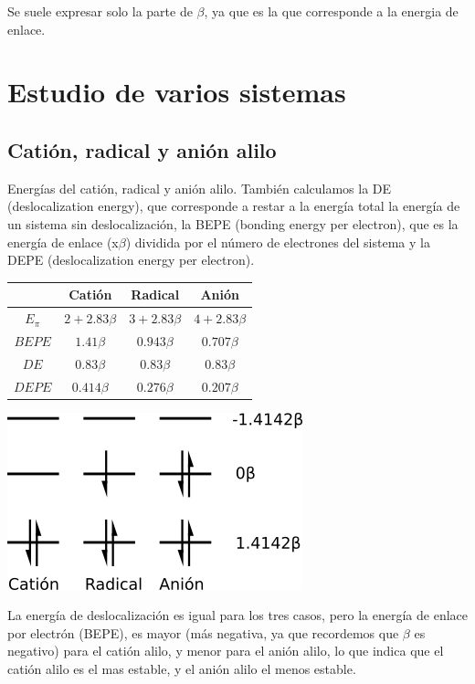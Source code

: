 \documentclass[12pt]{article}
\begin{document}
Se suele expresar solo la parte de $\beta$, ya que es la que corresponde a la energia de enlace.  \cite{yates}






\section{Estudio de varios sistemas}

\subsection{Catión, radical y anión alilo}

Energías del catión, radical y anión alilo.
También calculamos la DE (deslocalization energy), que corresponde a restar a la energía total la energía de un sistema sin deslocalización, la BEPE (bonding energy per electron), que es la energía de enlace (x$\beta$) dividida por el número de electrones del sistema y la DEPE (deslocalization energy per electron). \cite{yates}
\begin{center}
\begin{tabular}{|c|c|c|c|}
\hline
    & Catión & Radical & Anión \\
\hline
    $E_{\pi}$ & $2+2.83 \beta$  & $3+2.83 \beta$  & $4+2.83 \beta$ \\
    $BEPE$    & $1.41 \beta$    & $0.943 \beta$   & $0.707 \beta$  \\ 
    $DE$      & $0.83 \beta$    & $0.83 \beta$    & $0.83 \beta$   \\
    $DEPE$    & $0.414 \beta$   & $0.276 \beta$   & $0.207 \beta$  \\ 
\hline
\end{tabular}
\end{center}

\begin{center}
    \includegraphics[height=0.25\textwidth]{allyl_diagram.png}
\end{center}

La energía de deslocalización es igual para los tres casos, pero la energía de enlace por electrón (BEPE), es mayor (más negativa, ya que recordemos que $\beta$ es negativo) para el catión alilo, y menor para el anión alilo, lo que indica que el catión alilo es el mas estable, y el anión alilo el menos estable.
\end{document}
